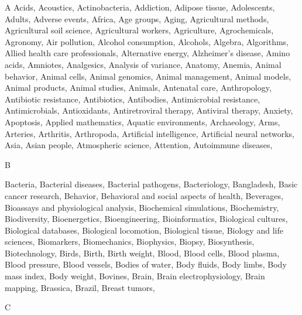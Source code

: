 A
Acids, Acoustics, Actinobacteria, Addiction, Adipose tissue, Adolescents, Adults, Adverse events, Africa, Age groups, Aging, Agricultural methods, Agricultural soil science, Agricultural workers, Agriculture, Agrochemicals, Agronomy, Air pollution, Alcohol consumption, Alcohols, Algebra, Algorithms, Allied health care professionals, Alternative energy, Alzheimer's disease, Amino acids, Amniotes, Analgesics, Analysis of variance, Anatomy, Anemia, Animal behavior, Animal cells, Animal genomics, Animal management, Animal models, Animal products, Animal studies, Animals, Antenatal care, Anthropology, Antibiotic resistance, Antibiotics, Antibodies, Antimicrobial resistance, Antimicrobials, Antioxidants, Antiretroviral therapy, Antiviral therapy, Anxiety, Apoptosis, Applied mathematics, Aquatic environments, Archaeology, Arms, Arteries, Arthritis, Arthropoda, Artificial intelligence, Artificial neural networks, Asia, Asian people, Atmospheric science, Attention, Autoimmune diseases, 

B

Bacteria, Bacterial diseases, Bacterial pathogens, Bacteriology, Bangladesh, Basic cancer research, Behavior, Behavioral and social aspects of health, Beverages, Bioassays and physiological analysis, Biochemical simulations, Biochemistry, Biodiversity, Bioenergetics, Bioengineering, Bioinformatics, Biological cultures, Biological databases, Biological locomotion, Biological tissue, Biology and life sciences, Biomarkers, Biomechanics, Biophysics, Biopsy, Biosynthesis, Biotechnology, Birds, Birth, Birth weight, Blood, Blood cells, Blood plasma, Blood pressure, Blood vessels, Bodies of water, Body fluids, Body limbs, Body mass index, Body weight, Bovines, Brain, Brain electrophysiology, Brain mapping, Brassica, Brazil, Breast tumors, 

C

